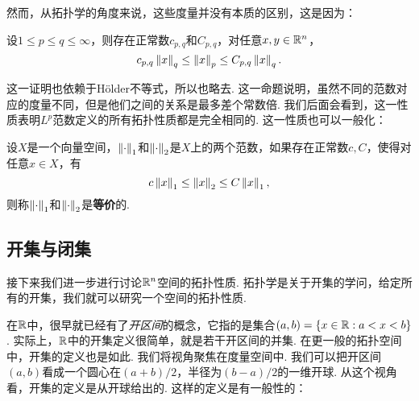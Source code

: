 \begin{center}
\end{center}

然而，从拓扑学的角度来说，这些度量并没有本质的区别，这是因为：

\begin{proposition}\label{prop:lp-metric}
    设$1\leq p\leq q\leq \infty$，则存在正常数$c_{p,q}$和$C_{p,q}$，对任意$x,y\in\mathbb{R}^n$，
    \[c_{p,q}\left\|x\right\|_q\leq \left\|x\right\|_p\leq C_{p,q}\left\|x\right\|_q.\]
\end{proposition}
这一证明也依赖于H\"older不等式，所以也略去. 这一命题说明，虽然不同的范数对应的度量不同，但是他们之间的关系是最多差个常数倍. 我们后面会看到，这一性质表明$L^p$范数定义的所有拓扑性质都是完全相同的. 这一性质也可以一般化：

\begin{definition}[等价范数]
    设$X$是一个向量空间，$\left\|\cdot\right\|_1$和$\left\|\cdot\right\|_2$是$X$上的两个范数，如果存在正常数$c,C$，使得对任意$x\in X$，有
    \[c\left\|x\right\|_1\leq \left\|x\right\|_2\leq C\left\|x\right\|_1,\]
    则称$\left\|\cdot\right\|_1$和$\left\|\cdot\right\|_2$是\textbf{等价}的. 
\end{definition}

\subsection{开集与闭集}
接下来我们进一步进行讨论$\mathbb{R}^n$空间的拓扑性质. 拓扑学是关于开集的学问，给定所有的开集，我们就可以研究一个空间的拓扑性质. 

在$\mathbb{R}$中，很早就已经有了\emph{开区间}的概念，它指的是集合$(a,b)=\{x\in\mathbb{R}:a<x<b\}$. 实际上，$\mathbb{R}$中的开集定义很简单，就是若干开区间的并集. 在更一般的拓扑空间中，开集的定义也是如此. 我们将视角聚焦在度量空间中. 我们可以把开区间$(a,b)$看成一个圆心在$(a+b)/2$，半径为$(b-a)/2$的一维开球. 从这个视角看，开集的定义是从开球给出的. 这样的定义是有一般性的：

